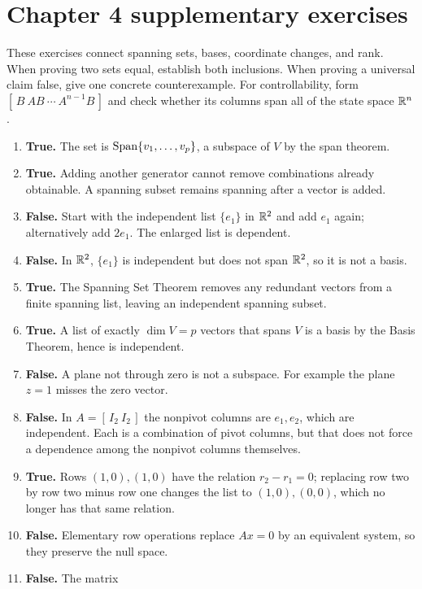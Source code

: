 \section{Chapter 4 supplementary exercises}
These exercises connect spanning sets, bases, coordinate changes, and rank.
When proving two sets equal, establish both inclusions. When proving a
universal claim false, give one concrete counterexample. For controllability,
form $[\,B\ AB\ \cdots\ A^{n-1}B\,]$ and check whether its columns span
all of the state space $\mathbb{R}^n$.

\begin{enumerate}[label=(\alph*)]
\item \textbf{True.} The set is $\operatorname{Span}\{v_1,\ldots,v_p\}$, a subspace
of $V$ by the span theorem.
\item \textbf{True.} Adding another generator cannot remove combinations
already obtainable. A spanning subset remains spanning after a vector is added.
\item \textbf{False.} Start with the independent list $\{e_1\}$ in
$\mathbb{R}^2$ and add $e_1$ again; alternatively add $2e_1$. The enlarged list is dependent.
\item \textbf{False.} In $\mathbb{R}^2$, $\{e_1\}$ is independent but does not
span $\mathbb{R}^2$, so it is not a basis.
\item \textbf{True.} The Spanning Set Theorem removes any redundant
vectors from a finite spanning list, leaving an independent spanning subset.
\item \textbf{True.} A list of exactly $\dim V=p$ vectors that spans
$V$ is a basis by the Basis Theorem, hence is independent.
\item \textbf{False.} A plane not through zero is not a subspace.
For example the plane $z=1$ misses the zero vector.
\item \textbf{False.} In $A=[\,I_2\ I_2\,]$ the nonpivot columns
are $e_1,e_2$, which are independent. Each is a combination of pivot
columns, but that does not force a dependence among the nonpivot columns themselves.
\item \textbf{True.} Rows $(1,0),(1,0)$ have the relation $r_2-r_1=0$;
replacing row two by row two minus row one changes the list to
$(1,0),(0,0)$, which no longer has that same relation.
\item \textbf{False.} Elementary row operations replace $Ax=0$ by an
equivalent system, so they preserve the null space.
\item \textbf{False.} The matrix

\end{enumerate}
